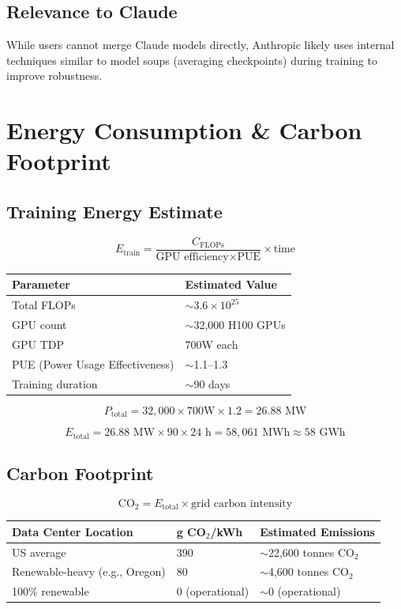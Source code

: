 \documentclass[11pt,a4paper]{article}
\begin{document}
\subsection{Relevance to Claude}

While users cannot merge Claude models directly, Anthropic likely uses internal techniques similar to model soups (averaging checkpoints) during training to improve robustness.

\section{Energy Consumption \& Carbon Footprint}

\subsection{Training Energy Estimate}

$$E_{\text{train}} = \frac{C_{\text{FLOPs}}}{\text{GPU efficiency} \times \text{PUE}} \times \text{time}$$

\begin{center}
\begin{tabular}{ll}
\toprule
\textbf{Parameter} & \textbf{Estimated Value} \\
\midrule
Total FLOPs & $\sim 3.6 \times 10^{25}$ \\
GPU count & $\sim$32,000 H100 GPUs \\
GPU TDP & 700W each \\
PUE (Power Usage Effectiveness) & $\sim$1.1--1.3 \\
Training duration & $\sim$90 days \\
\bottomrule
\end{tabular}
\end{center}

$$P_{\text{total}} = 32{,}000 \times 700\text{W} \times 1.2 = 26.88 \text{ MW}$$

$$E_{\text{total}} = 26.88\text{ MW} \times 90 \times 24\text{ h} = 58{,}061 \text{ MWh} \approx 58 \text{ GWh}$$

\subsection{Carbon Footprint}

$$\text{CO}_2 = E_{\text{total}} \times \text{grid carbon intensity}$$

\begin{center}
\begin{tabular}{lll}
\toprule
\textbf{Data Center Location} & \textbf{g CO$_2$/kWh} & \textbf{Estimated Emissions} \\
\midrule
US average & 390 & $\sim$22,600 tonnes CO$_2$ \\
Renewable-heavy (e.g., Oregon) & 80 & $\sim$4,600 tonnes CO$_2$ \\
100\% renewable & 0 (operational) & $\sim$0 (operational) \\
\bottomrule
\end{tabular}
\end{center}
\end{document}

